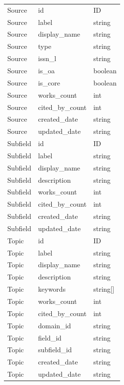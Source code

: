 \begin{longtable}{p{2.8cm}p{5.5cm}p{3cm}}
Source & id & ID \\
Source & label & string \\
Source & display\_name & string \\
Source & type & string \\
Source & issn\_l & string \\
Source & is\_oa & boolean \\
Source & is\_core & boolean \\
Source & works\_count & int \\
Source & cited\_by\_count & int \\
Source & created\_date & string \\
Source & updated\_date & string \\

Subfield & id & ID \\
Subfield & label & string \\
Subfield & display\_name & string \\
Subfield & description & string \\
Subfield & works\_count & int \\
Subfield & cited\_by\_count & int \\
Subfield & created\_date & string \\
Subfield & updated\_date & string \\

Topic & id & ID \\
Topic & label & string \\
Topic & display\_name & string \\
Topic & description & string \\
Topic & keywords & string[] \\
Topic & works\_count & int \\
Topic & cited\_by\_count & int \\
Topic & domain\_id & string \\
Topic & field\_id & string \\
Topic & subfield\_id & string \\
Topic & created\_date & string \\
Topic & updated\_date & string \\

\end{longtable}

